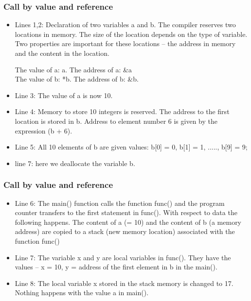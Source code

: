 \documentclass[compress]{beamer}
\begin{document}
\frame
{
  \frametitle{Call by value and reference}
\begin{small}
{\scriptsize
\begin{itemize}
%
\item Lines 1,2: Declaration of two variables a and b. The
compiler reserves two locations in memory. The size of the location
depends on the type of variable. Two properties are important for
these locations -- the address in memory and the content in the
location.

The value of a: a. The address of a: \&a\\
The value of b: *b. The address of b: \&b.
%
\item Line 3: The value of a is now 10.
%
\item Line 4: Memory to store 10 integers is reserved. The
address to the first location is stored in b. Address to element
number 6 is given by the expression (b + 6).
%
\item Line 5: All 10 elements of b are given values: b[0] = 0, b[1] =
1, ....., b[9] = 9;
\item line 7: here we deallocate the variable b.
\end{itemize}
}
\end{small}
}


\frame
{
  \frametitle{Call by value and reference}
\begin{small}
{\scriptsize
\begin{itemize}
\item Line 6: The main() function calls the function func() and the
program counter transfers to the first statement in func().
With respect to data the following happens. The content of a
(= 10) and the content of b (a memory address) are copied to a stack
(new memory location) associated with the function func()
%
\item Line 7: The variable x and y are local variables in
func(). They have the values -- x = 10, y = address of the first
element in b in the main().
%
\item Line 8: The local variable x stored in the stack memory is
changed to 17. Nothing happens with the value a in main().
%

\end{itemize}
}
\end{small}
}
\end{document}

